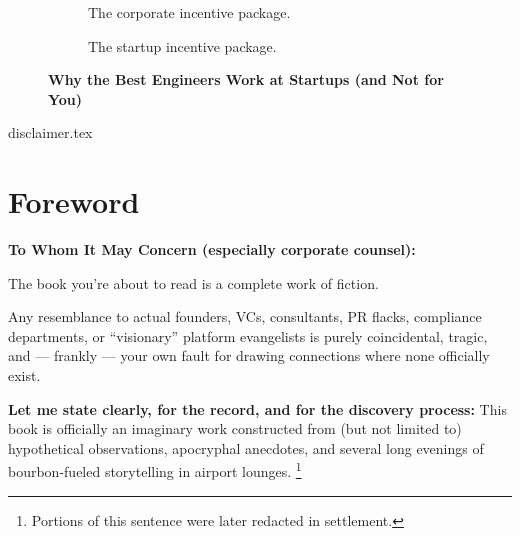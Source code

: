 \documentclass{article}
\begin{document}
\begin{titlepage}
\begin{figure}[H]
      \begin{subfigure}[t]{0.45\textwidth}
      \centering
      \caption*{The corporate incentive package.}
      \end{subfigure}
      \hfill
      \begin{subfigure}[t]{0.45\textwidth}
      \centering
      \caption*{The startup incentive package.}
      \end{subfigure}
      
      \caption*{\textbf{Why the Best Engineers Work at Startups (and Not for You)}}
    \end{figure}
      
  
  \end{titlepage}

  {disclaimer.tex}



  \section*{Foreword}
  
  \bigskip
  
  \textbf{To Whom It May Concern (especially corporate counsel):}
  
  The book you’re about to read is a complete work of fiction.
  
  Any resemblance to actual founders, VCs, consultants, PR flacks, compliance departments, or 
  ``visionary'' platform evangelists is purely coincidental, tragic, and --- frankly --- your own fault 
  for drawing connections where none officially exist.
  
  \textbf{Let me state clearly, for the record, and for the discovery process:}
  This book is officially an imaginary work 
  constructed from (but not limited to) hypothetical observations, apocryphal anecdotes, and several long evenings of 
  bourbon-fueled storytelling in airport lounges.
  \footnote{Portions of this sentence were later redacted in settlement.}
\end{document}
